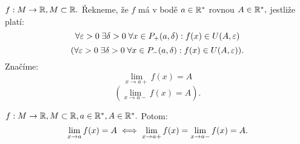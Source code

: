 \begin{definition}
    \Necht $f:M \rightarrow \mathbb{R}, M \subset \mathbb{R}.$ Řekneme, že $f$ má v bodě $a \in 
    \mathbb{R}^*$  rovnou $A \in \mathbb{R}^*,$ jestliže platí:
    $$\forall \varepsilon > 0 \; \exists \delta > 0 \; \forall x \in P_+(a,\delta): 
    f(x) \in U(A,\varepsilon)$$ 
    $$(\forall \varepsilon > 0 \; \exists \delta > 0 \; \forall x \in P_-(a,\delta): 
    f(x) \in U(A,\varepsilon)).$$
    Značíme:
    $$\lim_{x\to a+} f(x) = A$$
    $$(\lim_{x\to a-} f(x) = A).$$
\end{definition}

\begin{observation}
    \label{obs:jednostrannelimity}
    \Necht $f:M \rightarrow \mathbb{R}, M \subset \mathbb{R}, a \in \mathbb{R}^*, A \in \mathbb{R}^*.$ 
    Potom:
    $$\lim_{x \to a} f(x) = A \iff \lim_{x \to a +} f(x) = \lim_{x \to a -} f(x) = A.$$
\end{observation}

